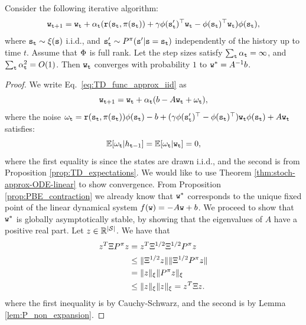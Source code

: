 \begin{enumerate}
\begin{theorem}
    Consider the following iterative algorithm:
    \begin{equation*}\label{eq:TD_func_approx_iid}
    {\tt w}_{{\tt t}+1} = {\tt w}_{\tt t} + \alpha_{\tt t} ( {\tt r}({\tt s}_{\tt t},\pi({\tt s}_{\tt t})) +\gamma {\phi}({\tt s}_{{\tt t}}')^\top {\tt w}_{\tt t} - {\phi}({\tt s}_{{\tt t}})^\top {\tt w}_{\tt t}) \phi({\tt s}_{{\tt t}}),
\end{equation*}
where ${\tt s}_{\tt t}\sim \xi({\tt s})$ i.i.d., and ${\tt s}_{{\tt t}}' \sim P^\pi({\tt s}'|{\tt s} = {\tt s}_{\tt t})$ independently of the history up to time $t$. Assume that $\Phi$ is full rank. Let the step sizes satisfy $\sum_{\tt t}
\alpha_{\tt t}
=\infty $, and 
$\sum_{\tt t} \alpha_{\tt t}^2=O(1)$. Then ${\tt w}_{\tt t}$
converges with probability $1$ to ${\tt w}^*= A^{-1}b$.
\end{theorem}
\begin{proof}
    We write Eq.~\eqref{eq:TD_func_approx_iid} as 
    \begin{equation*}
    {\tt w}_{{\tt t}+1} = {\tt w}_{\tt t} + \alpha_{\tt t} ( b -  A {\tt w}_{\tt t} + \omega_{\tt t} ),
\end{equation*}
where the noise $\omega_{\tt t} = {\tt r}({\tt s}_{\tt t},\pi({\tt s}_{\tt t}))\phi({\tt s}_{{\tt t}}) - b +  (\gamma{\phi}({\tt s}_{{\tt t}}')^\top - {\phi}({\tt s}_{{\tt t}})^\top) {\tt w}_{\tt t} \phi({\tt s}_{{\tt t}}) + A {\tt w}_{\tt t}$ satisfies: 
\begin{equation*}
\mathbb{E}[\omega_{\tt t}|h_{{\tt t}-1}]= \mathbb{E}[\omega_{\tt t}|{\tt w}_{\tt t}]= 0,
\end{equation*}
where the first equality is since the states are drawn i.i.d., and the second is from Proposition \ref{prop:TD_expectations}.
We would like to use Theorem \ref{thm:stoch-approx-ODE-linear} to show convergence. From Proposition \ref{prop:PBE_contraction} we already know that ${\tt w}^*$ corresponds to the unique fixed point of the linear dynamical system $f({\tt w}) = -A{\tt w} + b$.
We proceed to show that ${\tt w}^*$ is
globally asymptotically stable, by showing that the eigenvalues of $A$ have a positive real part. Let $z \in \mathbb{R}^{|\mathcal{S}|}$. We have that
\begin{equation*}
\begin{split}
    z^T \Xi P^\pi z &= z^T \Xi^{1/2} \Xi^{1/2} P^\pi z \\
    &\leq \| \Xi^{1/2} z \| \| \Xi^{1/2} P^\pi z \| \\
    &=\| z \|_{\xi} \| P^\pi z \|_{\xi} \\
    &\leq \| z \|_{\xi}\| z \|_{\xi} = z^T \Xi z.
\end{split}
\end{equation*}
where the first inequality is by Cauchy-Schwarz, and the second is by Lemma \ref{lem:P_non_expansion}.


\end{proof}
\end{enumerate}

